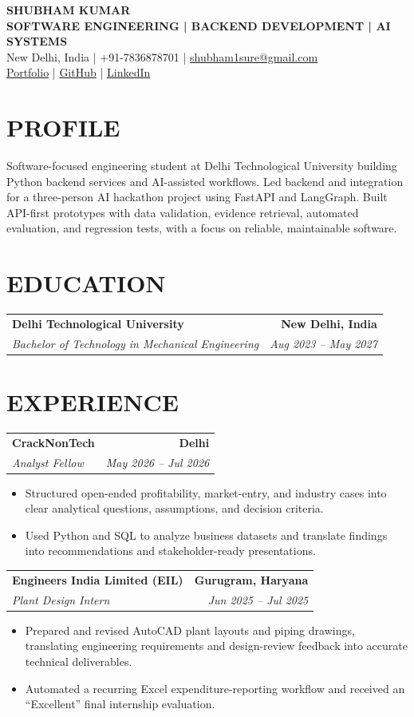 \documentclass[10pt,a4paper]{article}
\makeatletter
\newcommand{\resumeSubheading}[4]{%
  \begin{tabular*}{\textwidth}{@{}l@{\extracolsep{\fill}}r@{}}
    \textbf{#1} & \textbf{#2} \\
    \textit{#3} & \textit{#4}
  \end{tabular*}\vspace{-3pt}
}
\makeatother
\begin{document}
\begin{center}
  {\LARGE\bfseries SHUBHAM KUMAR}\\[2pt]
  {\small\bfseries SOFTWARE ENGINEERING \;|\; BACKEND DEVELOPMENT \;|\; AI SYSTEMS}\\[2pt]
  New Delhi, India \;|\; +91-7836878701 \;|\;
  \href{mailto:shubham1sure@gmail.com}{shubham1sure@gmail.com}\\[2pt]
  \href{https://nothing0g.github.io/analyst/}{Portfolio}
  \;|\;
  \href{https://github.com/Nothing0g}{GitHub}
  \;|\;
  \href{https://www.linkedin.com/in/shubham-kumar-diff/}{LinkedIn}
\end{center}

\vspace{-8pt}

\section*{PROFILE}
Software-focused engineering student at Delhi Technological University building Python backend services and AI-assisted workflows. Led backend and integration for a three-person AI hackathon project using FastAPI and LangGraph. Built API-first prototypes with data validation, evidence retrieval, automated evaluation, and regression tests, with a focus on reliable, maintainable software.

\section*{EDUCATION}
\resumeSubheading
  {Delhi Technological University}{New Delhi, India}
  {Bachelor of Technology in Mechanical Engineering}{Aug 2023 -- May 2027}

\section*{EXPERIENCE}
\resumeSubheading
  {CrackNonTech}{Delhi}
  {Analyst Fellow}{May 2026 -- Jul 2026}
\begin{itemize}
  \item Structured open-ended profitability, market-entry, and industry cases into clear analytical questions, assumptions, and decision criteria.
  \item Used Python and SQL to analyze business datasets and translate findings into recommendations and stakeholder-ready presentations.
\end{itemize}

\resumeSubheading
  {Engineers India Limited (EIL)}{Gurugram, Haryana}
  {Plant Design Intern}{Jun 2025 -- Jul 2025}
\begin{itemize}
  \item Prepared and revised AutoCAD plant layouts and piping drawings, translating engineering requirements and design-review feedback into accurate technical deliverables.
  \item Automated a recurring Excel expenditure-reporting workflow and received an ``Excellent'' final internship evaluation.
\end{itemize}
\end{document}
